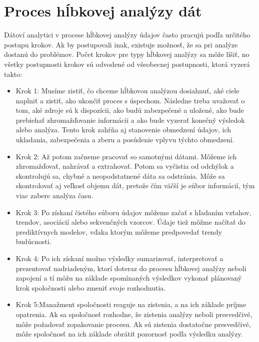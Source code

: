 \documentclass[10pt,twoside,slovak,a4paper]{article}
\begin{document}
\section{Proces hĺbkovej analýzy dát} 
Dátoví analytici v procese hĺbkovej analýzy údajov často pracujú podľa určitého postupu krokov. Ak by postupovali inak, existuje možnosť, že sa pri analýze dostanú do problémov. Počet krokov pre typy hĺbkovej analýzy sa môže líšiť, no všetky postupnosti krokov sú odvodené od všeobecnej postupnosti, ktorá vyzerá takto:\\
\begin{itemize}
\item Krok 1: Musíme zistiť, čo chceme hĺbkovou analýzou dosiahnuť, aké ciele naplniť a zistiť, ako ukončiť proces s úspechom. Následne treba uvažovať o tom, aké zdroje sú k dispozícii, ako budú zabezpečené a uložené, ako bude prebiehať zhromažďovanie informácii a ako bude vyzerať konečný výsledok alebo analýza. Tento krok zahŕňa aj stanovenie obmedzení údajov, ich ukladania, zabezpečenia a zberu a posúdenie vplyvu týchto obmedzení. \\
\item Krok 2: Až potom začneme pracovať so samotnými dátami. Môžeme ich zhromažďovať, nahrávať a extrahovať. Potom sa vyčistia od odchýlok a skontrolujú sa, chybné a neopodstatnené dáta sa odstránia. Môže sa skontrolovať aj veľkosť objemu dát, pretože čím väčší je súbor informácií, tým viac zabere analýza času. \\
\item Krok 3: Po získaní čistého súboru údajov môžeme začať s hľadaním vzťahov, trendov, asociácií alebo sekvenčných vzorcov. Údaje tiež môžme načítať do prediktívnych modelov, vďaka ktorým môžeme predpovedať trendy budúcnosti. \\
\item Krok 4: Po ich získaní možno výsledky sumarizovať, interpretovať a prezentovať nadriadeným, ktorí doteraz do procesu hĺbkovej analýzy neboli zapojení a tí môžu na základe spomínaných výsledkov vykonať plánovaný krok spoločnosti alebo zmeniť svoje rozhodnutia.\\
\item Krok 5:Manažment spoločnosti reaguje na zistenia, a na ich základe príjme opatrenia. Ak sa spoločnosť rozhodne, že zistenia analýzy neboli  presvedčivé, môže požadovať zopakovanie procesu. Ak sú zistenia dostatočne presvedčivé, môže spoločnosť na ich základe obrátiť pozornosť podľa výsledku analýzy.\cite{CraigSTD}\cite{IBM}\\
\\
\end{itemize}
\end{document}
